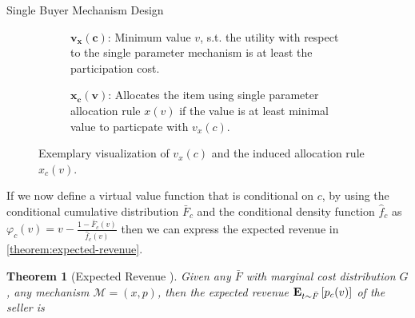 \documentclass[11pt,a4paper]{article}
\newtheorem{theorem}{Theorem}
\newcommand{\Ex}[2][]{\mbox{\rm\bf E}_{#1}\left[#2\right]}
\newcommand{\1}[1]{\mbox{\rm\bf 1}_{#1}}
\begin{document}
\begin{section}{Single Buyer Mechanism Design}
 \begin{figure}[htp!]
     \centering

     \begin{subfigure}{.4\textwidth}
         \centering
         \caption{
             $\mathbf{v_x(c)}$: Minimum value $v$, s.t. the utility with respect to the single parameter mechanism is at least the participation cost.
         }
     \end{subfigure}
     \begin{subfigure}{.4\textwidth}
         \centering
         \caption{
             $\mathbf{\mathbf{x_c(v)}}$: Allocates the item using single parameter allocation rule $x(v)$ if the value is at least minimal value to particpate with $v_x(c)$.
         }
     \end{subfigure}
     \caption{
         Exemplary visualization of $v_x(c)$ and the induced allocation rule $x_c(v)$.
     }
     \label{fig:visualization-of-induced-mechanism}
 \end{figure}

 If we now define a virtual value function that is conditional on $c$, by using the conditional cumulative distribution $\bar{F}_c$ and the conditional density function $\hat{f}_c$ as
 $\varphi_c(v) = v - \frac{1- \bar{F}_c(v)}{\hat{f}_c(v)}$ then we can express the expected revenue in \autoref{theorem:expected-revenue}.

 \begin{theorem}[Expected Revenue \cite{primary}]
     \label{theorem:expected-revenue}
     Given any $\bar{F}$ with marginal cost distribution $G$, any mechanism $\mathcal{M}=(x,p)$, then the expected revenue $\Ex[t \sim \bar{F}]{p_c(v)}$ of the seller is


\end{theorem}
\end{section}
\end{document}
